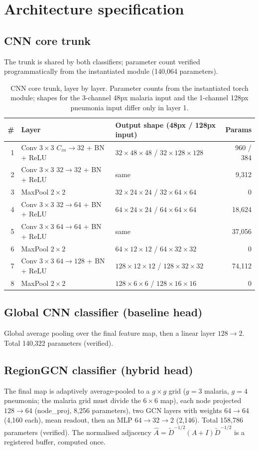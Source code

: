 
\section{Architecture specification}
\subsection{CNN core trunk}
The trunk is shared by both classifiers; parameter count verified
programmatically from the instantiated module (140{,}064 parameters).
\begin{table}[h]\centering\small
\begin{tabular}{r l l r}
\hline
\# & Layer & Output shape (48px / 128px input) & Params \\
\hline
1 & Conv $3{\times}3$ $C_{in}{\to}32$ + BN + ReLU & $32{\times}48{\times}48$ / $32{\times}128{\times}128$ & 960 / 384 \\
2 & Conv $3{\times}3$ $32{\to}32$ + BN + ReLU & same & 9{,}312 \\
3 & MaxPool $2{\times}2$ & $32{\times}24{\times}24$ / $32{\times}64{\times}64$ & 0 \\
4 & Conv $3{\times}3$ $32{\to}64$ + BN + ReLU & $64{\times}24{\times}24$ / $64{\times}64{\times}64$ & 18{,}624 \\
5 & Conv $3{\times}3$ $64{\to}64$ + BN + ReLU & same & 37{,}056 \\
6 & MaxPool $2{\times}2$ & $64{\times}12{\times}12$ / $64{\times}32{\times}32$ & 0 \\
7 & Conv $3{\times}3$ $64{\to}128$ + BN + ReLU & $128{\times}12{\times}12$ / $128{\times}32{\times}32$ & 74{,}112 \\
8 & MaxPool $2{\times}2$ & $128{\times}6{\times}6$ / $128{\times}16{\times}16$ & 0 \\
\hline
\end{tabular}
\caption{CNN core trunk, layer by layer. Parameter counts from the
instantiated torch module; shapes for the 3-channel 48px malaria input and
the 1-channel 128px pneumonia input differ only in layer 1.}
\label{tab:trunk}
\end{table}
\subsection{Global CNN classifier (baseline head)}
Global average pooling over the final feature map, then a linear layer
$128 \to 2$. Total 140{,}322 parameters (verified).
\subsection{RegionGCN classifier (hybrid head)}
The final map is adaptively average-pooled to a $g{\times}g$ grid
($g{=}3$ malaria, $g{=}4$ pneumonia; the malaria grid must divide the
$6{\times}6$ map), each node projected $128 \to 64$ (node\_proj, 8{,}256
parameters), two GCN layers with weights $64 \to 64$ (4{,}160 each),
mean readout, then an MLP $64 \to 32 \to 2$ (2{,}146). Total 158{,}786
parameters (verified). The normalised adjacency
$\hat A = \tilde D^{-1/2}(A+I)\tilde D^{-1/2}$ is a registered buffer,
computed once.
